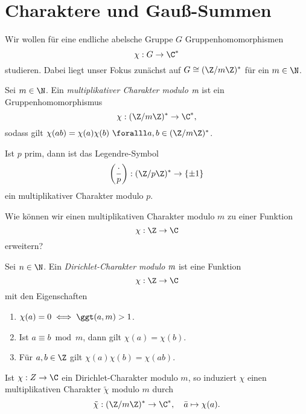 \chapter{Charaktere und Gauß-Summen}
\begin{idee*}
	Wir wollen für eine endliche abelsche Gruppe $G$ Gruppenhomomorphismen
	\[ \chi: G \to \C^* \]
	studieren. Dabei liegt unser Fokus zunächst auf $G \cong (\Z/m\Z)^*$ für ein $m \in \N$.
\end{idee*}

\begin{defn*}[Charakter] 
	Sei $m \in \N$. Ein \emph{multiplikativer Charakter modulo \( \emph{m} \)} ist ein Gruppenhomomorphismus
	\[ \chi: (\Z/m\Z)^* \to \C^*, \]
	sodass gilt $\chi(ab) = \chi(a)\chi(b)\ \foralll a,b \in (\Z/m\Z)^*$.
\end{defn*}

\begin{exmp*}
	Ist $p$ prim, dann ist das Legendre-Symbol
	\[ \left(\frac{\cdot}{p}\right): (\Z/p\Z)^* \to \{\pm 1\} \]
	ein multiplikativer Charakter modulo $p$.
\end{exmp*}

\begin{frage*}
	Wie können wir einen multiplikativen Charakter modulo $m$ zu einer Funktion \[ \chi: \Z \to \C \] erweitern?
\end{frage*}

\begin{defn*} 
	Sei $n \in \N$. Ein \emph{Dirichlet-Charakter modulo $\emph{m}$} ist eine Funktion
	\[ \chi: \Z \to \C \]
	mit den Eigenschaften
	\begin{enumerate}[label={\roman*})]
		\item $\chi(a) = 0 \iff \ggt(a,m)>1$.
		\item Ist $a \equiv b \bmod m$, dann gilt $\chi(a)=\chi(b)$.
		\item Für $a,b \in \Z$ gilt $\chi(a)\chi(b)=\chi(ab)$.
	\end{enumerate}
\end{defn*}

\begin{rem*}
	Ist $\chi : Z \to \C$ ein Dirichlet-Charakter modulo $m$, so induziert $\chi$ einen multiplikativen Charakter $\tilde{\chi}$ modulo $m$ durch
	\[ \tilde{\chi}: (\Z/m\Z)^* \to \C^*,\quad \bar{a} \mapsto \chi(a). \]
\end{rem*}

